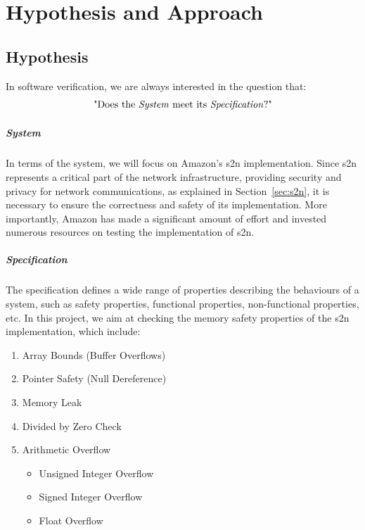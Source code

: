 \chapter{Hypothesis and Approach} %
\section{Hypothesis}
\label{sec:hypothesis}
In software verification, we are always interested in the question that: $$\text{"Does the \textit{System} meet its \textit{Specification}?"}$$


\paragraph{System} In terms of the system, we will focus on Amazon's s2n implementation. Since s2n represents a critical part of the network infrastructure, providing security and privacy for network communications, as explained in Section~\ref{sec:s2n}, it is necessary to ensure the correctness and safety of its implementation. More importantly, Amazon has made a significant amount of effort and invested numerous resources on testing the implementation of s2n.

\paragraph{Specification} The specification defines a wide range of properties describing the behaviours of a system, such as safety properties, functional properties, non-functional properties, etc. In this project, we aim at checking the memory safety properties of the s2n implementation, which include:

\begin{multicols}{2}
\begin{enumerate}[nosep]
    \item Array Bounds (Buffer Overflows)
    \item Pointer Safety (Null Dereference)
    \item Memory Leak
    \item Divided by Zero Check
    \item Arithmetic Overflow
        \begin{itemize}[nosep]
            \item Unsigned Integer Overflow
            \item Signed Integer Overflow
            \item Float Overflow
        \end{itemize}
\end{enumerate}
\end{multicols}

